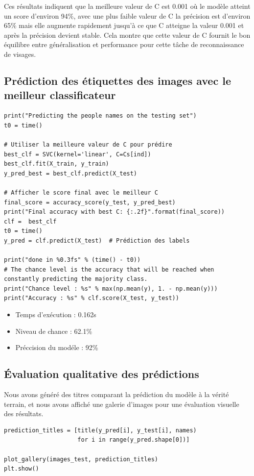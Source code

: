 \documentclass[12pt,a4paper]{report}
\begin{document}
Ces résultats indiquent que la meilleure valeur de C est 0.001 où le modèle atteint un score d'environ 94\%, avec une plus faible valeur de C la précision est d'environ 65\% mais elle augmente rapidement jusqu’à ce que C atteigne la valeur 0.001 et après la précision devient stable. Cela montre que cette valeur de C fournit le bon équilibre entre généralisation et performance pour cette tâche de reconnaissance de visages.
\subsection{Prédiction des étiquettes des images avec le meilleur classificateur}
\begin{lstlisting}
print("Predicting the people names on the testing set")
t0 = time()

# Utiliser la meilleure valeur de C pour prédire
best_clf = SVC(kernel='linear', C=Cs[ind])
best_clf.fit(X_train, y_train)
y_pred_best = best_clf.predict(X_test)

# Afficher le score final avec le meilleur C
final_score = accuracy_score(y_test, y_pred_best)
print("Final accuracy with best C: {:.2f}".format(final_score))
clf =  best_clf
t0 = time()
y_pred = clf.predict(X_test)  # Prédiction des labels

print("done in %0.3fs" % (time() - t0))
# The chance level is the accuracy that will be reached when constantly predicting the majority class.
print("Chance level : %s" % max(np.mean(y), 1. - np.mean(y)))
print("Accuracy : %s" % clf.score(X_test, y_test))
\end{lstlisting}
\begin{itemize}
    \item Temps d’exécution : 0.162s
    \item Niveau de chance : 62.1\%
    \item Préccision du modéle : 92\%
\end{itemize}

\subsection{Évaluation qualitative des prédictions}

Nous avons généré des titres comparant la prédiction du modèle à la vérité terrain,
 et nous avons affiché une galerie d’images pour une évaluation visuelle des résultats.
\begin{lstlisting}
prediction_titles = [title(y_pred[i], y_test[i], names)
                     for i in range(y_pred.shape[0])]

plot_gallery(images_test, prediction_titles)
plt.show()
\end{lstlisting}
\end{document}
